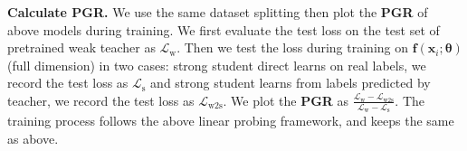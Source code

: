 \documentclass{article}
\theoremstyle{definition}
\theoremstyle{definition}
\theoremstyle{plain}
\theoremstyle{plain}
\theoremstyle{plain}
\theoremstyle{plain}
\theoremstyle{plain}
\begin{document}
\textbf{Calculate PGR.} We use the same dataset splitting then plot the \textbf{PGR} of above models during training. We first evaluate the test loss on the test set of pretrained weak teacher as $\mathcal{L}_{\mathrm{w}}$. Then we test the loss during training on $\mathbf{f}(\mathbf{x}_i; \boldsymbol{\theta})$ (full dimension) in two cases: strong student direct learns on real labels, we record the test loss as $\mathcal{L}_{\mathrm{s}}$ and strong student learns from labels predicted by teacher, we record the test loss as $\mathcal{L}_{\mathrm{w2s}}$. We plot the \textbf{PGR} as $\frac{\mathcal{L}_{\mathrm{w}}- \mathcal{L}_{\mathrm{w2s}}}{\mathcal{L}_{\mathrm{w}}- \mathcal{L}_{\mathrm{s}}}$. The training process  follows the above linear probing framework, and keeps the same as above.
\end{document}
